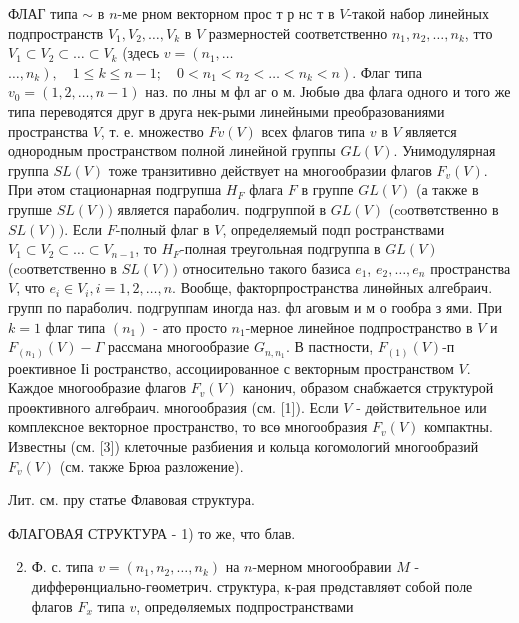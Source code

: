 \documentclass[10pt]{article}
\begin{document}
ФЛАГ типа $\boldsymbol{\sim}$ в $n$-ме рном векторном прос т р нс т в $V$-такой набор линейных подпространств $V_{1}, V_{2}, \ldots, V_{k}$ в $V$ размерностей соответственно $n_{1}, n_{2}, \ldots, n_{k}$, тто $V_{1} \subset V_{2} \subset \ldots \subset V_{k}$ (здесь $v=\left(n_{1}, \ldots\right.$ $\left.\left.\ldots, n_{k}\right), \quad 1 \leqslant k \leqslant n-1 ; \quad 0<n_{1}<n_{2}<\ldots<n_{k}<n\right)$. Флаг типа $v_{0}=(1,2, \ldots, n-1)$ наз. по лны м фл аг о м. Јюбыө два флага одного и того же типа переводятся друг в друга нек-рыми линейными преобразованиями пространства $V$, т. е. множество $F v(V)$ всех флагов типа $v$ в $V$ является однородным пространством полной линейной группы $G L(V)$. Унимодулярная группа $S L(V)$ тоже транзитивно действует на многообразии флагов $F_{v}(V)$. При әтом стационарная подгрупша $H_{F}$ флага $F$ в группе $G L(V)$ (а также в групше $S L(V))$ является параболич. подгруппой в $G L(V)$ (coотвөтственно в $S L(V))$. Если $F$-полный флаг в $V$, определяемый подп ространствами $V_{1} \subset V_{2} \subset \ldots \subset V_{n-1}$, то $H_{F}$-полная треугольная подгруппа в $G L(V)$ (coответственно в $S L(V))$ относительно такого базиса $e_{1}$, $e_{2}, \ldots, e_{n}$ пространства $V$, что $e_{i} \in V_{i}, i=1,2, \ldots, n$. Вообще, факторпространства линөйных алгебраич. групп по параболич. подгруппам иногда наз. фл аговым и м о гообра з ями. При $k=1$ флаг типа $\left(n_{1}\right)$ - ато просто $n_{1}$-мерное линейное подпространство в $V$ и $F_{\left(n_{1}\right)}(V)-\Gamma$ рассмана многообразие $G_{n, n_{1}}$. В пастности, $F_{(1)}(V)$-п роективное Іі ространство, ассоциированное с векторным пространством $V$. Каждое многообразие флагов $F_{v}(V)$ канонич, образом снабжается структурой проөктивного алгөбраич. многообразия (см. [1]). Если $V$ - дөйствительное или комплексное векторное пространство, то всө многообразия $F_{v}(V)$ компактны. Известны (см. [3]) клеточные разбиения и кольца когомологий многообразий $F_{v}(V)$ (см. также Брюа разложение).



Лит. см. пру статье Флавовая структура.



ФЛАГОВАЯ СТРУКТУРА - 1) то же, что блав.



\begin{enumerate}

  \setcounter{enumi}{1}

  \item Ф. с. типа $v=\left(n_{1}, n_{2}, \ldots, n_{k}\right)$ на $n$-мерном многообравии $M$ - дифферөнциально-гөометрич. структура, к-рая прөдставляөт собой поле флагов $F_{x}$ типа $v$, опредөляемых подпространствами

\end{enumerate}
\end{document}
